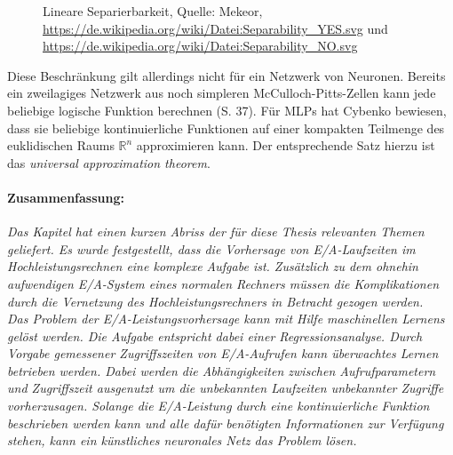 \documentclass[
	12pt,
	a4paper,
	BCOR10mm,
	DIV14,
	listof=totoc,
	bibliography=totoc,
	headsepline
]{scrreprt}
\begin{document}
\begin{figure}
	\hfill
	\caption{Lineare Separierbarkeit, Quelle: Mekeor, \url{https://de.wikipedia.org/wiki/Datei:Separability_YES.svg} und \url{https://de.wikipedia.org/wiki/Datei:Separability_NO.svg}}
	\label{fig:separierbarkeit}
\end{figure} 

Diese Beschränkung gilt allerdings nicht für ein Netzwerk von Neuronen. Bereits ein zweilagiges Netzwerk aus noch simpleren McCulloch-Pitts-Zellen kann jede beliebige logische Funktion berechnen \cite{Rojas:1996:NNS:235222} (S. 37).
Für MLPs hat Cybenko \cite{cybenko:mcss} bewiesen, dass sie beliebige kontinuierliche Funktionen auf einer kompakten Teilmenge des euklidischen Raums $\mathbb{R}^n$ approximieren kann. Der entsprechende Satz hierzu ist das \textit{universal approximation theorem}.

\bigskip
\paragraph{Zusammenfassung:}
\textit{ 
	Das Kapitel hat einen kurzen Abriss der für diese Thesis relevanten Themen geliefert. Es wurde festgestellt, dass die Vorhersage von E/A-Laufzeiten im Hochleistungsrechnen eine komplexe Aufgabe ist. Zusätzlich zu dem ohnehin aufwendigen E/A-System eines normalen Rechners müssen die Komplikationen durch die Vernetzung des Hochleistungsrechners in Betracht gezogen werden.\\
	Das Problem der E/A-Leistungsvorhersage kann mit Hilfe maschinellen Lernens gelöst werden. Die Aufgabe entspricht dabei einer Regressionsanalyse. Durch Vorgabe gemessener Zugriffszeiten von E/A-Aufrufen kann überwachtes Lernen betrieben werden. Dabei werden die Abhängigkeiten zwischen Aufrufparametern und Zugriffszeit ausgenutzt um die unbekannten Laufzeiten unbekannter Zugriffe vorherzusagen.
	Solange die E/A-Leistung durch eine kontinuierliche Funktion beschrieben werden kann und alle dafür benötigten Informationen zur Verfügung stehen, kann ein künstliches neuronales Netz das Problem lösen.
}
\end{document}

